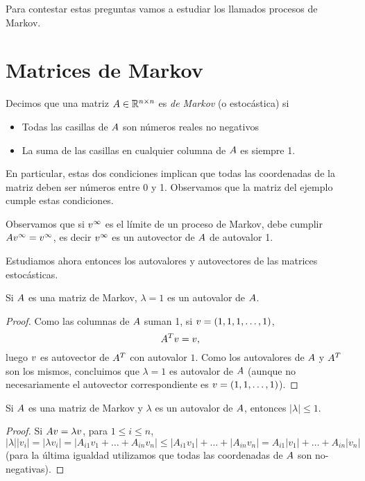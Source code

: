 \begin{ejemplo}
Para contestar estas preguntas vamos a estudiar los llamados procesos de Markov.

\section{Matrices de Markov}

\begin{defi}
Decimos que una matriz $\Ab \in \Rnn$ es \emph{de Markov} (o estocástica) si
\begin{itemize}
\item Todas las casillas de $\Ab$ son números reales no negativos
\item La suma de las casillas en cualquier columna de $\Ab$ es siempre 1.
\end{itemize}
\end{defi}

En particular, estas dos condiciones implican que todas las coordenadas de la matriz deben ser números entre 0 y 1. Observamos que la matriz del ejemplo cumple estas condiciones.

Observamos que si $\vb^{\infty}$ es el límite de un proceso de Markov, debe cumplir $\Ab \vb^{\infty} = \vb^{\infty}$, es decir $\vb^{\infty}$ es un autovector de $\Ab$ de autovalor 1.

Estudiamos ahora entonces los autovalores y autovectores de las matrices estocásticas.

\begin{prop}
Si $\Ab$ es una matriz de Markov, $\lambda = 1$ es un autovalor de $\Ab$.
\end{prop}

\begin{proof}
Como las columnas de $\Ab$ suman 1, si $\vb = (1,1,1, \dots, 1)$,
$$\Ab^T \vb = \vb,$$
luego $\vb$ es autovector de $\Ab^T$ con autovalor $1$. Como los autovalores de $\Ab$ y $\Ab^T$ son los mismos, concluimos que $\lambda = 1$ es autovalor de $\Ab$ (aunque no necesariamente el autovector correspondiente es $\vb = (1, 1, \dots, 1)$).
\end{proof}

\begin{prop}
Si $\Ab$ es una matriz de Markov y $\lambda$ es un autovalor de $\Ab$, entonces $|\lambda| \le 1$.
\end{prop}

\begin{proof}
Si $\Ab \vb = \lambda \vb$, para $1 \le i \le n$,
$$
|\lambda| |v_i| = |\lambda v_i| = |A_{i1} v_1 + \dots + A_{in} v_n| \le |A_{i1} v_1| + \dots + |A_{in} v_n| = A_{i1} |v_1| + \dots + A_{in} |v_n|
$$
(para la última igualdad utilizamos que todas las coordenadas de $\Ab$ son no-negativas).


\end{proof}
\end{ejemplo}
